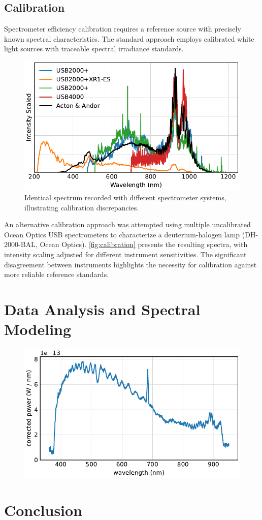 \documentclass[
	parskip=half,
	a4paper,
]{scrarticle}
\begin{document}
\subsection{Calibration}

Spectrometer efficiency calibration requires a reference source with precisely known spectral characteristics. The standard approach employs calibrated white light sources with traceable spectral irradiance standards.

\begin{figure}[hb]
    \centering
    \includegraphics{../analysis/figures/efficiency_different.pdf}
    \caption{Identical spectrum recorded with different spectrometer systems, illustrating calibration discrepancies.}
    \label{fig:calibration}
\end{figure}

An alternative calibration approach was attempted using multiple uncalibrated Ocean Optics USB spectrometers to characterize a deuterium-halogen lamp (DH-2000-BAL, Ocean Optics). \autoref{fig:calibration} presents the resulting spectra, with intensity scaling adjusted for different instrument sensitivities. The significant disagreement between instruments highlights the necessity for calibration against more reliable reference standards.


\clearpage
\section{Data Analysis and Spectral Modeling}
\begin{figure}
    \centering
    \includegraphics{../analysis/figures/corrected spectrum.pdf}
    \caption{}
\end{figure}

\clearpage
\section{Conclusion}

\clearpage
\printbibliography
\end{document}
